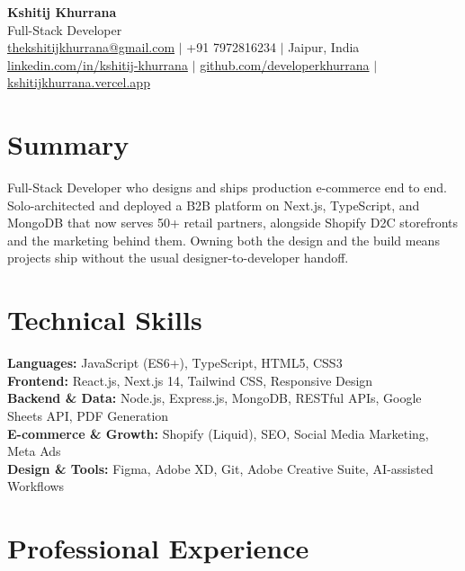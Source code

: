 \documentclass[10pt,a4paper]{article}
\begin{document}
\begin{center}
    {\LARGE \textbf{Kshitij Khurrana}} \\[2pt]
    {\large Full-Stack Developer} \\[4pt]
    \href{mailto:thekshitijkhurrana@gmail.com}{thekshitijkhurrana@gmail.com} $|$
    +91 7972816234 $|$
    Jaipur, India \\
    \href{https://linkedin.com/in/kshitij-khurrana}{linkedin.com/in/kshitij-khurrana} $|$
    \href{https://github.com/developerkhurrana}{github.com/developerkhurrana} $|$
    \href{https://kshitijkhurrana.vercel.app}{kshitijkhurrana.vercel.app}
\end{center}

\vspace{-4pt}

\section*{Summary}
Full-Stack Developer who designs and ships production e-commerce end to end. Solo-architected and deployed a B2B platform on Next.js, TypeScript, and MongoDB that now serves 50+ retail partners, alongside Shopify D2C storefronts and the marketing behind them. Owning both the design and the build means projects ship without the usual designer-to-developer handoff.

\section*{Technical Skills}
\textbf{Languages:} JavaScript (ES6+), TypeScript, HTML5, CSS3 \\
\textbf{Frontend:} React.js, Next.js 14, Tailwind CSS, Responsive Design \\
\textbf{Backend \& Data:} Node.js, Express.js, MongoDB, RESTful APIs, Google Sheets API, PDF Generation \\
\textbf{E-commerce \& Growth:} Shopify (Liquid), SEO, Social Media Marketing, Meta Ads \\
\textbf{Design \& Tools:} Figma, Adobe XD, Git, Adobe Creative Suite, AI-assisted Workflows

\section*{Professional Experience}
\end{document}
